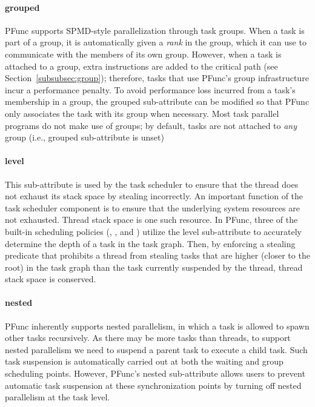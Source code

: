 \paragraph{grouped} PFunc supports SPMD-style parallelization through task
groups.
%
When a task is part of a group, it is automatically given a \emph{rank} in the 
group, which it can use to communicate with the members of its own group.
%
However, when a task is attached to a group, extra instructions are added to 
the critical path (see Section~\ref{subsubsec:group}); therefore, tasks that
use PFunc's group infrastructure incur a performance penalty.
%
To avoid performance loss incurred from a task's membership in a group, the
grouped sub-attribute can be modified so that PFunc only associates the task
with its group when necessary.
%
Most task parallel programs do not make use of groups; by default, tasks are
not attached to \textit{any} group (i.e., grouped sub-attribute is unset)

\paragraph{level} This sub-attribute is used by the task scheduler to
ensure that the thread does not exhaust its stack space by stealing
incorrectly.
%
An important function of the task scheduler component is to ensure that the
underlying system resources are not exhausted. 
%
Thread stack space is one such resource.
%
In PFunc, three of the built-in scheduling policies (,
, and ) utilize the level sub-attribute to accurately
determine the depth of a task in the task graph.
%
Then, by enforcing a stealing predicate that prohibits a thread from stealing
tasks that are higher (closer to the root) in the task graph than the task 
currently suspended by the thread, thread stack space is conserved.
%

\paragraph{nested} PFunc inherently supports nested parallelism, in which
a task is allowed to spawn other tasks recursively.
%
As there may be more tasks than threads, to support nested parallelism we
need to suspend a parent task to execute a child task.
%
Such task suspension is automatically carried out at both the waiting and 
group scheduling points.
%
However, PFunc's nested sub-attribute allows users to prevent automatic task
suspension at these synchronization points by turning off nested parallelism at
the task level.
%

